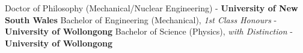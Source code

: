 %
%
%

\begin{scholarship}
					{Doctor of Philosophy (Mechanical/Nuclear Engineering) - \textbf{University of New South Wales}}
					{Bachelor of Engineering (Mechanical), \textit{1st Class Honours} - \textbf{University of Wollongong}}
					{Bachelor of Science (Physics), \textit{with Distinction} - \textbf{University of Wollongong}}
\end{scholarship}